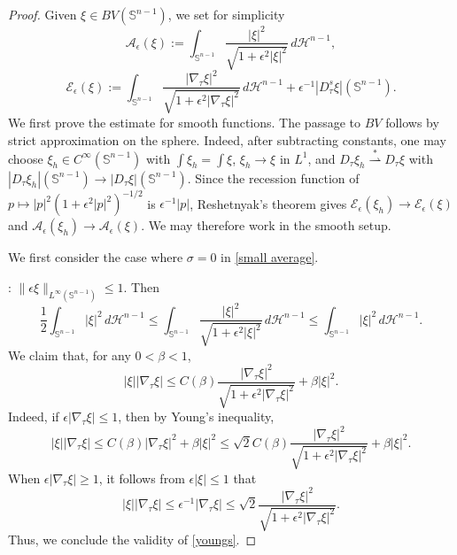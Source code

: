 \documentclass[10pt,a4paper]{amsart}
\def\bz{\beta}
\def\ez{\epsilon}
\def\sz{\sigma}
\begin{document}
\begin{proof}
Given $\xi\in BV(\mathbb S^{n-1})$,  we set for simplicity
$$
\mathcal A_\epsilon(\xi):=\int_{\mathbb S^{n-1}} \frac{|\xi|^2}{\sqrt{1+\epsilon^2|\xi|^2}}\,d\mathscr H^{n-1},
$$
$$
\mathcal E_\epsilon(\xi):=\int_{\mathbb S^{n-1}} \frac{|\nabla_\tau \xi|^2}{\sqrt{1+\epsilon^2|\nabla_\tau \xi|^2}}\,d\mathscr H^{n-1}
+\ez^{-1}|D^s_\tau \xi|(\mathbb S^{n-1}).
$$
We first prove the estimate for smooth functions. The passage to $BV$ follows by strict approximation on the sphere. Indeed, after subtracting constants, one may choose
$\xi_h\in C^\infty(\mathbb S^{n-1})$ with
$\int\xi_h=\int\xi$, $\xi_h\to\xi$ in $L^1$, and
$D_\tau\xi_h\stackrel{*}{\rightharpoonup}D_\tau\xi$ with
$|D_\tau\xi_h|(\mathbb S^{n-1})\to |D_\tau\xi|(\mathbb S^{n-1})$. Since the
recession function of $p\mapsto |p|^2(1+\epsilon^2|p|^2)^{-1/2}$ is
$\epsilon^{-1}|p|$, Reshetnyak's theorem gives
$\mathcal E_\epsilon(\xi_h) \to \mathcal E_\epsilon(\xi)$ and
$\mathcal A_\epsilon(\xi_h)\to\mathcal A_\epsilon(\xi)$. We may therefore work
in the smooth setup.

We first consider the case where $\sz=0$ in \eqref{small average}.

\medskip
{}: $\|\ez \xi\|_{L^\infty(\mathbb S^{n-1})}\le 1$. Then
\begin{equation}\label{comparable}
 \frac 1 2 \int_{\mathbb S^{n-1}}  {|\xi|^2}  \,d\mathscr H^{n-1}\le \int_{\mathbb S^{n-1}} \frac{|\xi|^2}{\sqrt{1+\ez^2|\xi|^2}} \,d\mathscr H^{n-1}\le \int_{\mathbb S^{n-1}}  {|\xi|^2}  \,d\mathscr H^{n-1}.
\end{equation}
We claim that, for any $0<\bz<1$,
\begin{equation}\label{youngs}
|\xi||\nabla_\tau \xi|\le C(\bz) \frac{|\nabla_\tau  \xi|^2}{\sqrt{1+\ez^2|\nabla_\tau \xi|^2}} + \bz |\xi|^2.
\end{equation}
Indeed, if $\ez|\nabla_\tau \xi|\le 1$, then by Young's inequality,
$$|\xi||\nabla_\tau \xi|\le C(\beta)  |\nabla_\tau \xi|^2 +\bz |\xi|^2\le \sqrt{2} C(\bz) \frac{|\nabla_\tau  \xi|^2}{\sqrt{1+\ez^2|\nabla_\tau \xi|^2}} + \bz |\xi|^2. $$
When $\ez |\nabla_\tau \xi|\ge 1$, it follows from $\ez|\xi|\le 1$ that
$$|\xi||\nabla_\tau \xi|\le \ez^{-1} |\nabla_\tau \xi|\le \sqrt{2}  \frac{|\nabla_\tau  \xi|^2}{\sqrt{1+\ez^2|\nabla_\tau \xi|^2}}. $$
Thus, we conclude the validity of \eqref{youngs}.


\end{proof}
\end{document}

